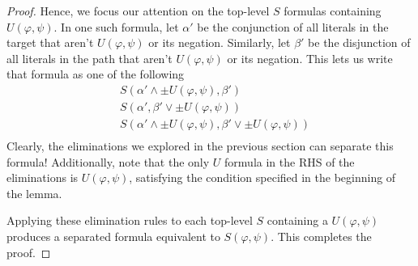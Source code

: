 \documentclass[a4paper,UKenglish,cleveref, autoref, thm-restate, numberwithinsect]{lipics-v2021}
\begin{document}
\begin{proof}
    Hence, we focus our attention on the top-level $S$ formulas containing $U(\varphi, \psi)$. In one such formula, let $\alpha'$ be the conjunction of all literals in the target that aren't $U(\varphi, \psi)$ or its negation. Similarly, let $\beta'$ be the disjunction of all literals in the path that aren't $U(\varphi, \psi)$ or its negation. This lets us write that formula as one of the following
    \begin{equation*}
        \begin{aligned}
            &S(\alpha' \land \pm U(\varphi, \psi), \beta')\\
            &S(\alpha', \beta' \lor \pm U(\varphi, \psi))\\
            &S(\alpha' \land \pm U(\varphi, \psi), \beta' \lor \pm U(\varphi, \psi))\\
        \end{aligned}
    \end{equation*}
    Clearly, the eliminations we explored in the previous section can separate this formula! Additionally, note that the only $U$ formula in the RHS of the eliminations is $U(\varphi, \psi)$, satisfying the condition specified in the beginning of the lemma.

    Applying these elimination rules to each top-level $S$ containing a $U(\varphi, \psi)$ produces a separated formula equivalent to $S(\varphi, \psi)$. This completes the proof.
\end{proof}
\end{document}
